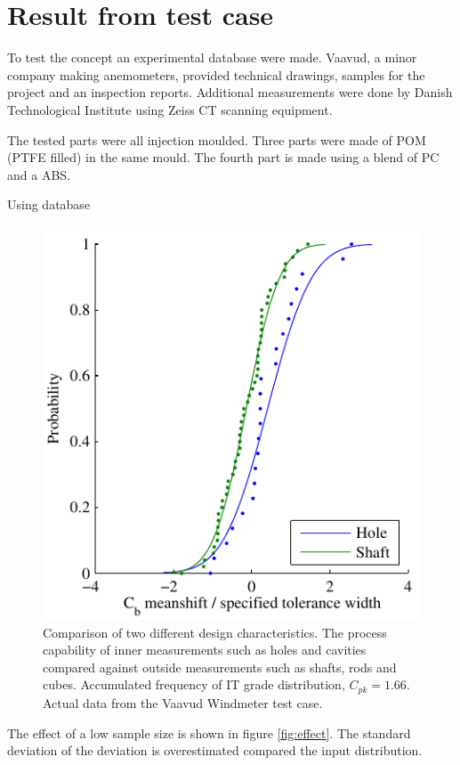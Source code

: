 \documentclass[aip,amsmath, reprint, author-year]{revtex4-1}
\begin{document}
\section{Result from test case}
\label{sec:result}

To test the concept an experimental database were made. 
Vaavud, a minor company making anemometers, provided technical drawings,  samples for the project and an inspection reports. 
Additional measurements were done by Danish Technological Institute using Zeiss CT scanning equipment.

The tested parts were all injection moulded. 
Three parts were made of POM (PTFE filled) in the same mould. 
The fourth part is made using a blend of PC and a ABS.

Using database  

\begin{figure}
\includegraphics{Cb_holeshaft.pdf}
\caption{\label{fig:acumfreqF3} Comparison of two different design characteristics. 
The process capability of inner measurements such as holes and cavities compared against outside measurements such as shafts, rods and cubes. 
Accumulated frequency of IT grade distribution, $C_{pk} =1.66$. 
Actual data from the Vaavud Windmeter test case. }
\end{figure}


The effect of a low sample size is shown in figure \ref{fig:effect}. 
The standard deviation of the deviation is overestimated compared the input distribution.
\end{document}
